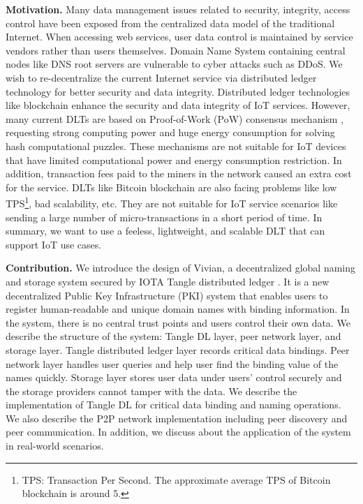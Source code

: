 \begin{onehalfspace}
\end{onehalfspace}
\noindent\textbf{Motivation.} Many data management issues related to security, integrity, access control have been exposed from the centralized data model of the traditional Internet.
When accessing web services, user data control is maintained by service vendors rather than users themselves.
Domain Name System containing central nodes like DNS root servers are vulnerable to cyber attacks such as DDoS.
We wish to re-decentralize the current Internet service via distributed ledger technology for better security and data integrity.
Distributed ledger technologies like blockchain enhance the security and data integrity of IoT services.
However, many current DLTs are based on Proof-of-Work (PoW) consensus mechanism \cite{10.1145/2976749.2978341}, requesting strong computing power and huge energy consumption for solving hash computational puzzles.
These mechanisms are not suitable for IoT devices that have limited computational power and energy consumption restriction. In addition, transaction fees paid to the miners in the network caused an extra cost for the service.
DLTs like Bitcoin blockchain are also facing problems like low TPS\footnote{TPS: Transaction Per Second. The approximate average TPS of Bitcoin blockchain is around 5.}, bad scalability, etc.
They are not suitable for IoT service scenarios like sending a large number of micro-transactions in a short period of time. 
In summary, we want to use a feeless, lightweight, and scalable DLT that can support IoT use cases.


\begin{onehalfspace}
\end{onehalfspace}
\noindent\textbf{Contribution.} We introduce the design of Vivian, a decentralized global naming and storage system secured by IOTA Tangle distributed ledger \cite{popov2015tangle}.
It is a new decentralized Public Key Infrastructure (PKI) system that enables users to register human-readable and unique domain names with binding information.
In the system, there is no central trust points and users control their own data.
We describe the structure of the system: Tangle DL layer, peer network layer, and storage layer.
Tangle distributed ledger layer records critical data bindings. Peer network layer handles user queries and help user find the binding value of the names quickly.
Storage layer stores user data under users' control securely and the storage providers cannot tamper with the data.
We describe the implementation of Tangle DL for critical data binding and naming operations.
We also describe the P2P network implementation including peer discovery and peer communication.
In addition, we discuss about the application of the system in real-world scenarios.